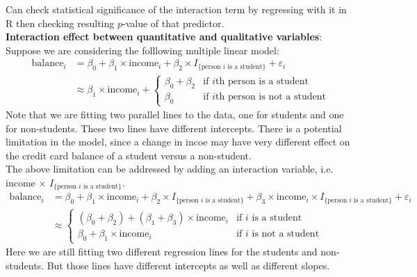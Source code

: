 \documentclass[11pt]{article}
\begin{document}
\noindent Can check statistical significance of the interaction term by regressing with it in R then checking resulting $p$-value of that predictor. \\

\noindent \textbf{Interaction effect between quantitative and qualitative variables}: \\
\noindent Suppose we are considering the folllowing multiple linear model:
\begin{align*}
    \text{balance}_i &= \beta_0 + \beta_1 \times \text{income}_i + \beta_2 \times I_{\{ \text{person $i$ is a student} \}} + \varepsilon_i \\
    &\approx \beta_1 \times \text{income}_i + \begin{cases}
        \beta_0 + \beta_2 & \text{if $i$th person is a student} \\
        \beta_0 & \text{if $i$th person is not a student}
    \end{cases}
\end{align*} \phantom{i}
\noindent Note that we are fitting two parallel lines to the data, one for students and one for non-students. These two lines have different intercepts. There is a potential limitation in the model, since a change in incoe may have very different effect on the credit card balance of a student versus a non-student. \\

\noindent The above limitation can be addressed by adding an interaction variable, i.e. income $\times$ $I_{\{ \text{person $i$ is a student} \}}$. \\
\begin{align*}
    \text{balance}_i &= \beta_0 + \beta_1 \times \text{income}_i + \beta_2 \times I_{\{ \text{person $i$ is a student} \}} + \beta_3 \times \text{income}_i \times I_{\{ \text{person $i$ is a student} \}} + \varepsilon_i \\
    &\approx \begin{cases}
        (\beta_0 + \beta_2) + (\beta_1 + \beta_3) \times \text{income}_i & \text{if $i$ is a student} \\
        \beta_0 + \beta_1 \times \text{income}_i & \text{if $i$ is not a student}
    \end{cases}
\end{align*} \phantom{i}
\noindent Here we are still fitting two different regression lines for the students and non-students. But those lines have different intercepts as well as different slopes.
\end{document}
